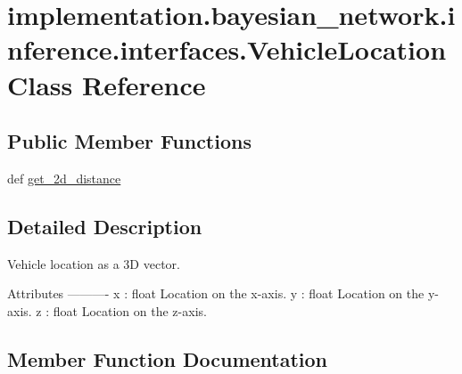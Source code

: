 \hypertarget{classimplementation_1_1bayesian__network_1_1inference_1_1interfaces_1_1_vehicle_location}{}\section{implementation.\+bayesian\+\_\+network.\+inference.\+interfaces.\+Vehicle\+Location Class Reference}
\label{classimplementation_1_1bayesian__network_1_1inference_1_1interfaces_1_1_vehicle_location}
\subsection*{Public Member Functions}
\begin{DoxyCompactItemize}
\item 
def \hyperlink{classimplementation_1_1bayesian__network_1_1inference_1_1interfaces_1_1_vehicle_location_ac4b413d04513cd20e4290da212f6d7f2}{get\+\_\+2d\+\_\+distance}
\end{DoxyCompactItemize}


\subsection{Detailed Description}
\begin{DoxyVerb}Vehicle location as a 3D vector.

Attributes
----------
x : float
    Location on the x-axis.
y : float
    Location on the y-axis.
z : float
    Location on the z-axis.
\end{DoxyVerb}
 

\subsection{Member Function Documentation}
\mbox{\label{classimplementation_1_1bayesian__network_1_1inference_1_1interfaces_1_1_vehicle_location_ac4b413d04513cd20e4290da212f6d7f2}} 
